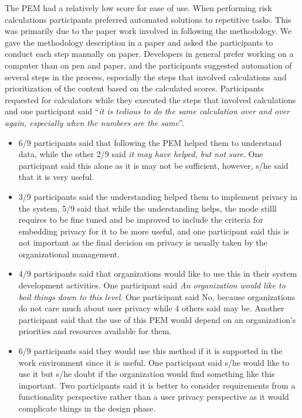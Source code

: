 \documentclass{sigchi}
\begin{document}
The PEM had a relatively low score for ease of use. When performing risk calculations participants preferred automated solutions to repetitive tasks. This was primarily due to the paper work involved in following the methodology. We gave the methodology description in a paper and asked the participants to conduct each step manually on paper. Developers in general prefer working on a computer than on pen and paper, and the participants suggested automation of several steps in the process, especially the steps that involved calculations and prioritization of the content based on the calculated scores. Participants requested for calculators while they executed the steps that involved calculations and one participant said \enquote{\textit {it is tedious to do the same calculation over and over again, especially when the numbers are the same}}. 

\begin{itemize}
\item 6/9 participants said that following the PEM helped them to understand data, while the other 2/9 said \textit{it may have helped, but not sure}. One participant said this alone as it is may not be sufficient, however, s/he said that it is very useful. 
\item 3/9 participants said the understanding helped them to implement privacy in the system, 5/9 said that while the understanding helps, the mode stilll requires to be fine tuned and be improved to include the criteria for embedding privacy for it to be more useful, and one participant said this is not important as the final decision on privacy is usually taken by the organizational management.
\item 4/9 participants said that organizations would like to use this in their system development activities. One participant said \textit{An organization would like to boil things down to this level}. One participant said No, because organizations do not care much about user privacy while 4 others said may be. Another participant said that the use of this PEM would depend on an organization's priorities and resources available for them.
\item 6/9 participants said they would use this method if it is supported in the work environment since it is useful. One participant said s/he would like to use it but s/he doubt if the organization would find something like this important. Two participants said it is better to consider requirements from a functionality perspective rather than a user privacy perspective as it would complicate things in the design phase.
\end{itemize}
\end{document}
